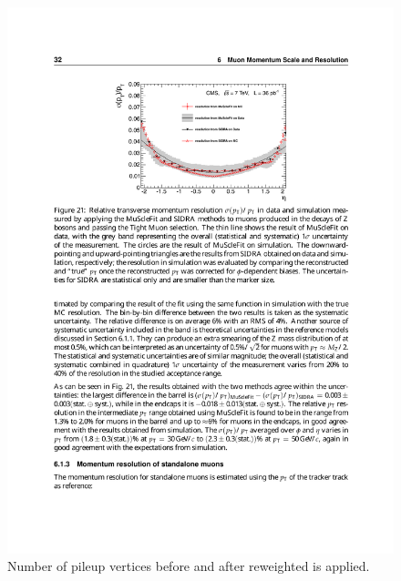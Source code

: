 \begin{figure}[tbh]
\centering
\includegraphics[width=5in]{figures/muonres.pdf}
\caption{Number of pileup vertices before and after reweighted is applied.}
\label{fig:pfmet_m4lblinded}
\end{figure}




